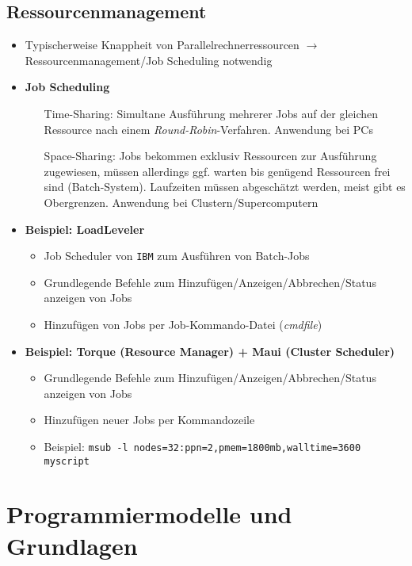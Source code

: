 \subsection{Ressourcenmanagement}
\begin{itemize}
	\item Typischerweise Knappheit von Parallelrechnerressourcen \(\rightarrow\) Ressourcenmanagement/Job Scheduling notwendig
	\item \textbf{Job Scheduling}
	\begin{enumerate}
		\item[Time-Sharing:] Simultane Ausführung mehrerer Jobs auf der gleichen Ressource nach einem \textit{Round-Robin}-Verfahren. Anwendung bei PCs
		\item[Space-Sharing:] Jobs bekommen exklusiv Ressourcen zur Ausführung zugewiesen, müssen allerdings ggf. warten bis genügend Ressourcen frei sind (Batch-System). Laufzeiten müssen abgeschätzt werden, meist gibt es Obergrenzen. Anwendung bei Clustern/Supercomputern
	\end{enumerate}
	\item \textbf{Beispiel: LoadLeveler}
	\begin{itemize}
		\item Job Scheduler von \texttt{IBM} zum Ausführen von Batch-Jobs
		\item Grundlegende Befehle zum Hinzufügen/Anzeigen/Abbrechen/Status anzeigen von Jobs
		\item Hinzufügen von Jobs per Job-Kommando-Datei (\textit{cmdfile})
	\end{itemize}
	\item \textbf{Beispiel: Torque (Resource Manager) + Maui (Cluster Scheduler)}
	\begin{itemize}
		\item Grundlegende Befehle zum Hinzufügen/Anzeigen/Abbrechen/Status anzeigen von Jobs
		\item Hinzufügen neuer Jobs per Kommandozeile
		\item Beispiel: \texttt{msub -l nodes=32:ppn=2,pmem=1800mb,walltime=3600 myscript}
	\end{itemize}
\end{itemize}



\section{Programmiermodelle und Grundlagen}

